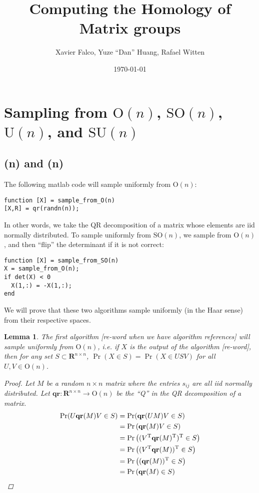 \documentclass[letterpaper,11pt]{article}
\title{Computing the Homology of Matrix groups}
\author{Xavier Falco, Yuze ``Dan'' Huang, Rafael Witten}
\date{\today}
\newtheorem{lemma}{Lemma}
\newcommand{\Tr}{^\text{T}}
\newcommand{\reals}{\mathbf{R}}
\newcommand{\MG}[2]{\text{#1}(#2)}
\newcommand{\qr}{\mathbf{qr}}
\begin{document}
\begin{titlepage}
\vspace{3in}
\maketitle
\thispagestyle{empty}
\end{titlepage}
\tableofcontents
\thispagestyle{empty}
\section{Sampling from $\MG{O}{n}$, $\MG{SO}{n}$, $\MG{U}{n}$, and $\MG{SU}{n}$}

\subsection{\MG{O}{n} and \MG{SO}{n}}
The following matlab code will sample uniformly from $\MG{O}{n}$:

\begin{verbatim}
function [X] = sample_from_O(n)
[X,R] = qr(randn(n));
\end{verbatim}

In other words, we take the QR decomposition of a matrix whose elements are iid
  normally distributed.
To sample uniformly from $\MG{SO}{n}$, we sample from $\MG{O}{n}$, and then
  ``flip'' the determinant if it is not correct:

\begin{verbatim}
function [X] = sample_from_SO(n)
X = sample_from_O(n);
if det(X) < 0
  X(1,:) = -X(1,:);
end
\end{verbatim}

We will prove that these two algorithms sample uniformly (in the Haar sense)
  from their respective spaces.

\begin{lemma}
The first algorithm [re-word when we have algorithm references] will sample
  uniformly from $\MG{O}{n}$, i.e. if $X$ is the output of the algorithm
  [re-word], then for any set $S\subset \reals^{n\times n}$, $\Pr(X\in S) =
  \Pr(X\in USV)$ for all $U,V \in \MG{O}{n}$.

\begin{proof}
Let $M$ be a random $n\times n$ matrix where the entries $s_{ij}$ are all iid
  normally distributed.
Let $\qr:\reals^{n\times n} \to \MG{O}{n}$ be the ``Q'' in the QR decomposition
  of a matrix.
\begin{align}
\Pr(U\qr(M)V\in S) &= \Pr(\qr(UM)V \in S)\\
  &= \Pr\left(\qr(M)V \in S             \right)\\
  &= \Pr\left( (V\Tr\qr(M)\Tr)\Tr \in S \right)\\
  &= \Pr\left( (V\Tr\qr(M))\Tr \in S    \right)\\
  &= \Pr\left((\qr(M))\Tr \in S         \right)\\
  &= \Pr\left(\qr(M) \in S              \right)\qedhere
\end{align}
\end{proof}
\end{lemma}
\end{document}
